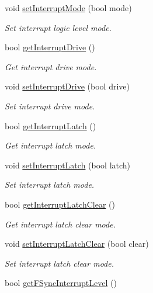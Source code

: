 \begin{DoxyCompactItemize}
void \mbox{\hyperlink{classMPU6050_a003a098a1521c5ef4df50c0a8a2d47ab}{set\+Interrupt\+Mode}} (bool mode)
\begin{DoxyCompactList}\small\item\em Set interrupt logic level mode. \end{DoxyCompactList}\item 
bool \mbox{\hyperlink{classMPU6050_af66e6c7b1885dcf452e73371790fddfd}{get\+Interrupt\+Drive}} ()
\begin{DoxyCompactList}\small\item\em Get interrupt drive mode. \end{DoxyCompactList}\item 
void \mbox{\hyperlink{classMPU6050_a9d9d6aeea346e6f6fad8e4a428cf3301}{set\+Interrupt\+Drive}} (bool drive)
\begin{DoxyCompactList}\small\item\em Set interrupt drive mode. \end{DoxyCompactList}\item 
bool \mbox{\hyperlink{classMPU6050_a5502c4c2a9bc4ea9267e128b7743923d}{get\+Interrupt\+Latch}} ()
\begin{DoxyCompactList}\small\item\em Get interrupt latch mode. \end{DoxyCompactList}\item 
void \mbox{\hyperlink{classMPU6050_abf9ccf9eb6c7156e6660abb76734920a}{set\+Interrupt\+Latch}} (bool latch)
\begin{DoxyCompactList}\small\item\em Set interrupt latch mode. \end{DoxyCompactList}\item 
bool \mbox{\hyperlink{classMPU6050_a9a098a607e20c64b60e155da35b8264f}{get\+Interrupt\+Latch\+Clear}} ()
\begin{DoxyCompactList}\small\item\em Get interrupt latch clear mode. \end{DoxyCompactList}\item 
void \mbox{\hyperlink{classMPU6050_a2fa64c7030242aac18bd6727e8ca4a54}{set\+Interrupt\+Latch\+Clear}} (bool clear)
\begin{DoxyCompactList}\small\item\em Set interrupt latch clear mode. \end{DoxyCompactList}\item 
bool \mbox{\hyperlink{classMPU6050_a60fc85d4f27f99d07ffb9543d5e5f347}{get\+F\+Sync\+Interrupt\+Level}} ()

\end{DoxyCompactItemize}
